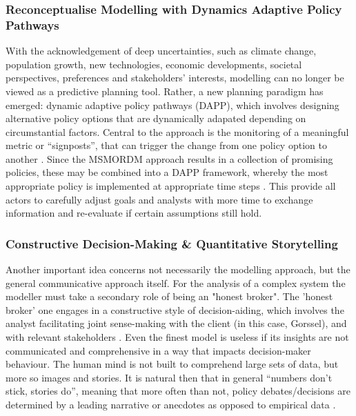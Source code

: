 \subsubsection{Reconceptualise Modelling with Dynamics Adaptive Policy Pathways}

With the acknowledgement of deep uncertainties, such as climate change, population growth, new technologies, economic developments, societal perspectives, preferences and stakeholders’ interests, modelling can no longer be viewed as a predictive planning tool. Rather, a new planning paradigm has emerged: dynamic adaptive policy pathways (DAPP), which involves designing alternative policy options that are dynamically adapated depending on circumstantial factors. Central to the approach is the monitoring of a meaningful metric or “signposts”, that can trigger the change from one policy option to another \parencite{haasnoot_dynamic_2013}. Since the MSMORDM approach results in a collection of promising policies, these may be combined into a DAPP framework, whereby the most appropriate policy is implemented at appropriate time steps \parencite{kwakkel_developing_2015}. This provide all actors to carefully adjust goals and analysts with more time to exchange information and re-evaluate if certain assumptions still hold. 

\subsubsection{Constructive Decision-Making \& Quantitative Storytelling}

Another important idea concerns not necessarily the modelling approach, but the general communicative approach itself. For the analysis of a complex system the modeller must take a secondary role of being an "honest broker". The 'honest broker' one engages in a constructive style of decision-aiding, which involves the analyst facilitating joint sense-making with the client (in this case, Gorssel), and with relevant stakeholders \parencite{tsoukias_decision_2008}. Even the finest model is useless if its insights are not communicated and comprehensive in a way that impacts decision-maker behaviour. The human mind is not built to comprehend large sets of data, but more so images and stories. It is natural then that in general “numbers don’t stick, stories do”, meaning that more often than not, policy debates/decisions are determined by a leading narrative or anecdotes as opposed to empirical data \parencite{kettl_making_2016}.  

